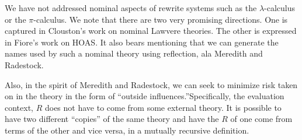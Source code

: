 \documentclass{llncs}
\renewcommand{\:}{\colon}
\newcommand{\pic}{$\pi$-calculus}
\newcommand{\lamc}{$\lambda$-calculus}
\begin{document}
We have not addressed nominal aspects of rewrite systems such as the
{\lamc} or the {\pic}. We note that there are two very
promising directions. One is captured in Clouston's work on nominal
Lawvere theories. \cite{DBLP:journals/jcss/Clouston14} The other is
expressed in Fiore's work on HOAS. \cite{DBLP:conf/csl/FioreH10} It
also bears mentioning that we can generate the names used by such a
nominal theory using reflection, ala Meredith and
Radestock. \cite{DBLP:conf/tgc/MeredithR05}

Also, in the spirit of Meredith and Radestock, we can seek to minimize
risk taken on in the theory in the form of “outside
influences.”Specifically, the evaluation context, $R$ does not have to
come from some external theory. It is possible to have two different
``copies'' of the same theory and have the $R$ of one come from terms
of the other and vice versa, in a mutually recursive definition.



\end{document}
